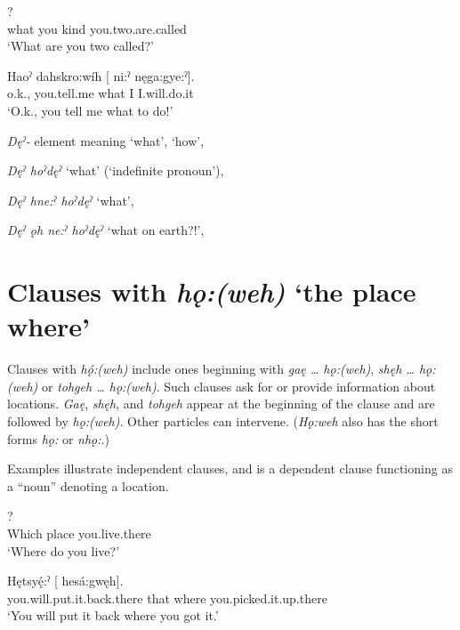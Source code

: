 \ea\label{ex:whatquesex}
?\\
what you kind you.two.are.called\\
\glt ‘What are you two called?’
\z

\ea\label{ex:whatquesex2}
\gll Haoˀ dahskro:wíh [ ni:ˀ nęga:gye:ˀ]. \\
o.k., you.tell.me what I I.will.do.it\\
\glt ‘O.k., you tell me what to do!’ 
\z

\begin{CayugaRelated}
\item{}\textit{Dęˀ-} element meaning ‘what’, ‘how’, 

\item{}\textit{Dęˀ hoˀdęˀ} ‘what’ (‘indefinite pronoun’), 

\item{}\textit{Dęˀ hne:ˀ hoˀdęˀ} ‘what’, 

\item{}\textit{Dęˀ ǫh ne:ˀ hoˀdęˀ} ‘what on earth?!’, 
\end{CayugaRelated}


\section{Clauses with \textit{hǫ:(weh)} ‘the place where’} \label{ch:Clauses with [hǫ:(weh)] ‘the place where’}
Clauses with \textit{hǫ́:(weh)} include ones beginning with \textit{gaę … hǫ:(weh)}, \textit{shęh … hǫ:(weh)} or \textit{tohgeh … hǫ:(weh)}. Such clauses ask for or provide information about locations. \textit{Gaę}, \textit{shęh}, and \textit{tohgeh} appear at the beginning of the clause and are followed by \textit{hǫ:(weh)}. Other particles can intervene. (\textit{Hǫ:weh} also has the short forms \textit{hǫ:} or \textit{nhǫ:}.) 

Examples  illustrate independent clauses, and  is a dependent clause functioning as a “noun” denoting a location.

\ea\label{ex:where1}
?\\
Which place you.live.there\\
\glt ‘Where do you live?’ 
\z

\ea\label{ex:where2}
\gll Hętsyę́:ˀ [   hesá:gwęh]. \\
you.will.put.it.back.there that where you.picked.it.up.there\\
\glt ‘You will put it back where you got it.’
\z

